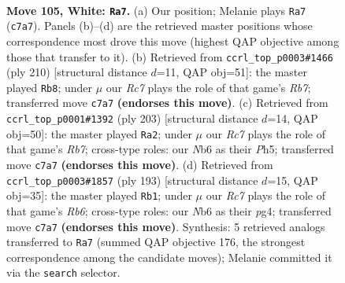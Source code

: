 \documentclass[11pt]{article}
\begin{document}
\clearpage

\begin{figure}[p]\centering
\begin{subfigure}{0.46\textwidth}\centering
\resizebox{\linewidth}{!}{%
\newchessgame
\chessboard[
  setfen={8/2R3pk/1N3p2/7p/7P/6PK/4r3/8 w - - 34 105},
  showmover=false,
  pgfstyle=straightmove, color=movearrow, markmove={c7-a7}
]}
\caption{}
\end{subfigure}\hfill
\begin{subfigure}{0.46\textwidth}\centering
\resizebox{\linewidth}{!}{%
\newchessgame
\chessboard[
  setfen={8/1R3pk1/4p3/4P1P1/4KP2/r7/8/8 w - - 27 106},
  showmover=false,
  pgfstyle=straightmove, color=movearrow, markmove={b7-b8}
]}
\caption{}
\end{subfigure}
\\[4pt]
\begin{subfigure}{0.46\textwidth}\centering
\resizebox{\linewidth}{!}{%
\newchessgame
\chessboard[
  setfen={3R4/5pk1/6p1/7p/7P/6P1/1r3PK1/8 b - - 22 102},
  showmover=false,
  pgfstyle=straightmove, color=movearrow, markmove={b2-a2}
]}
\caption{}
\end{subfigure}\hfill
\begin{subfigure}{0.46\textwidth}\centering
\resizebox{\linewidth}{!}{%
\newchessgame
\chessboard[
  setfen={3R4/5pk1/7p/6pP/6P1/1r2P2K/5P2/8 b - - 18 97},
  showmover=false,
  pgfstyle=straightmove, color=movearrow, markmove={b3-b1}
]}
\caption{}
\end{subfigure}
\caption{\textbf{Move 105, White: \texttt{Ra7}.} (a) Our position; Melanie plays \texttt{Ra7} (\texttt{c7a7}). Panels (b)--(d) are the retrieved master positions whose correspondence most drove this move (highest QAP objective among those that transfer to it). (b) Retrieved from \texttt{ccrl\_top\_p0003\#1466} (ply 210) [structural distance $d$=11, QAP obj=51]: the master played \texttt{Rb8}; under $\mu$ our \emph{Rc7} plays the role of that game's \emph{Rb7}; transferred move \texttt{c7a7} \textbf{(endorses this move)}. (c) Retrieved from \texttt{ccrl\_top\_p0001\#1392} (ply 203) [structural distance $d$=14, QAP obj=50]: the master played \texttt{Ra2}; under $\mu$ our \emph{Rc7} plays the role of that game's \emph{Rb7}; cross-type roles: our \emph{N}b6 as their \emph{P}h5; transferred move \texttt{c7a7} \textbf{(endorses this move)}. (d) Retrieved from \texttt{ccrl\_top\_p0003\#1857} (ply 193) [structural distance $d$=15, QAP obj=35]: the master played \texttt{Rb1}; under $\mu$ our \emph{Rc7} plays the role of that game's \emph{Rb6}; cross-type roles: our \emph{N}b6 as their \emph{p}g4; transferred move \texttt{c7a7} \textbf{(endorses this move)}. Synthesis: 5 retrieved analogs transferred to \texttt{Ra7} (summed QAP objective 176, the strongest correspondence among the candidate moves); Melanie committed it via the \texttt{search} selector.}
\label{fig:thought-m208}
\end{figure}
\end{document}
